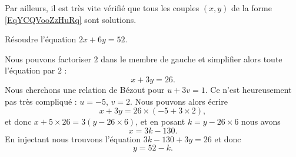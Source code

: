 Par ailleurs, il est très vite vérifié que tous les couples \( (x,y)\) de la forme \eqref{EqYCQVooZzHuRq} sont solutions.

\begin{example}
    Résoudre l'équation \( 2x+6y=52\).

    Nous pouvons factoriser \( 2\) dans le membre de gauche et simplifier alors toute l'équation par \( 2\) :
    \begin{equation}
        x+3y=26.
    \end{equation}
    Nous cherchons une relation de Bézout pour \( u+3v=1\). Ce n'est heureusement pas très compliqué : \( u=-5\), \( v=2\). Nous pouvons alors écrire
    \begin{equation}
        x+3y=26\times (-5+3\times 2),
    \end{equation}
    et donc \( x+5\times 26=3(y-26\times 6)\), et en posant \( k=y-26\times 6\) nous avons
    \begin{equation}
        x=3k-130.
    \end{equation}
    En injectant nous trouvons l'équation \( 3k-130+3y=26\) et donc
    \begin{equation}
        y=52-k.
    \end{equation}
\end{example}
